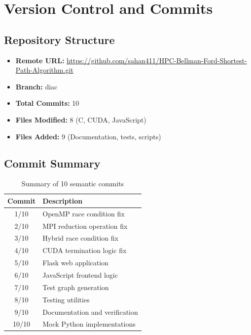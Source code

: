 \documentclass[12pt,a4paper]{article}
\begin{document}
\newpage

\section{Version Control and Commits}

\subsection{Repository Structure}

\begin{itemize}
    \item \textbf{Remote URL:} \url{https://github.com/sahan411/HPC-Bellman-Ford-Shortest-Path-Algorithm.git}
    \item \textbf{Branch:} diac
    \item \textbf{Total Commits:} 10
    \item \textbf{Files Modified:} 8 (C, CUDA, JavaScript)
    \item \textbf{Files Added:} 9 (Documentation, tests, scripts)
\end{itemize}

\subsection{Commit Summary}

\begin{table}[H]
    \centering
    \renewcommand{\arraystretch}{1.6}
    \begin{tabular}{|c|l|}
    \hline
    \textbf{Commit} & \textbf{Description} \\
    \hline
    1/10 & OpenMP race condition fix \\
    2/10 & MPI reduction operation fix \\
    3/10 & Hybrid race condition fix \\
    4/10 & CUDA termination logic fix \\
    5/10 & Flask web application \\
    6/10 & JavaScript frontend logic \\
    7/10 & Test graph generation \\
    8/10 & Testing utilities \\
    9/10 & Documentation and verification \\
    10/10 & Mock Python implementations \\
    \hline
    \end{tabular}
    \caption{Summary of 10 semantic commits}
    \label{tab:commits}
\end{table}
\end{document}
